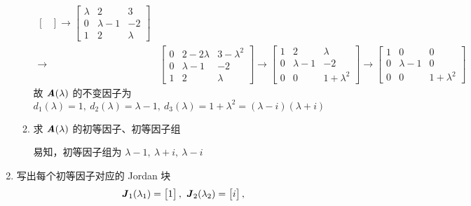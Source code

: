 \begin{solution}
\begin{enumerate}
\begin{enumerate}
\begin{align*}
\begin{bmatrix}
                                \end{bmatrix} \rightarrow \begin{bmatrix}
                                    \lambda & 2 & 3 \\ 0 & \lambda - 1 & -2 \\ 1 & 2 & \lambda
                                \end{bmatrix} \\ \rightarrow& \begin{bmatrix}
                                    0 & 2-2\lambda & 3 - \lambda^2 \\ 0 & \lambda - 1 & -2 \\ 1 & 2 & \lambda
                                \end{bmatrix} \rightarrow \begin{bmatrix}
                                    1 & 2 & \lambda \\ 0 & \lambda - 1 & -2 \\ 0 & 0 &  1 + \lambda^2 
                                \end{bmatrix} \rightarrow \begin{bmatrix}
                                    1 & 0 & 0 \\ 0 & \lambda - 1 & 0 \\ 0 & 0 &  1 + \lambda^2 
                                \end{bmatrix}
                            \end{align*}
                            故 $\textbf{\textit{A}}(\lambda)$ 的不变因子为 $d_1(\lambda) = 1, \ d_2(\lambda) = \lambda - 1, \ d_3(\lambda) = 1 + \lambda^2 = (\lambda - i)(\lambda + i)$
                            \item 求 $\textbf{\textit{A}}(\lambda)$ 的初等因子、初等因子组
                                \par 易知，初等因子组为 $\lambda - 1, \ \lambda + i, \ \lambda - i$
                        \end{enumerate}
                        \item 写出每个初等因子对应的 Jordan 块
                            \begin{align*}
                                \textbf{\textit{J}}_1(\lambda_1) = \begin{bmatrix} 1 \end{bmatrix}, \ 
                                \textbf{\textit{J}}_2(\lambda_2) = \begin{bmatrix} i \end{bmatrix}, \ 

\end{align*}
\end{enumerate}
\end{solution}

